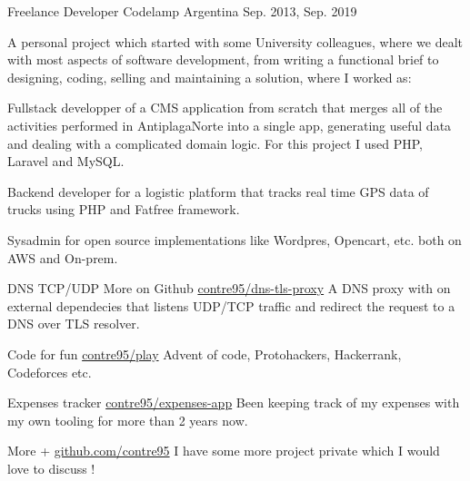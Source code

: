 \hypersetup{colorlinks}
\begin{cventries}

	\cventry
	{Freelance Developer} %
	{Codelamp} %
	{Argentina} %
	{Sep. 2013, Sep. 2019} %
	{
		{A personal project which started with some University colleagues, where we dealt with most aspects of software development, from writing a functional brief to designing, coding, selling and maintaining a solution, where I worked as: }
		\linebreak
		\begin{cvitems}
			\item {Fullstack developper of a CMS application from scratch that merges all of the activities performed in AntiplagaNorte into a single app, generating useful data and dealing with a complicated domain logic. For this project I used PHP, Laravel and MySQL.}
			\item {Backend developer for a logistic platform that tracks real time GPS data of trucks using PHP and Fatfree framework.}
			\item {Sysadmin for open source implementations like Wordpres, Opencart, etc. both on AWS and On-prem.}
		\end{cvitems}
	}


	\cventry
	{DNS TCP/UDP } %
	{More on Github} %
	{} %
    {\href{https://github.com/contre95/dns-tls-proxy}{\url{contre95/dns-tls-proxy}}}
    {A DNS proxy with on external dependecies that listens UDP/TCP traffic and redirect the request to a DNS over TLS resolver.}

	\cventry
	{Code for fun} %
	{} %
	{} %
	{\href{https://github.com/contre95/play}{\url{contre95/play}}} %
    {Advent of code, Protohackers, Hackerrank, Codeforces etc. }

	\cventry
	{Expenses tracker} %
	{} %
	{} %
	{\href{https://github.com/contre95/expenses-app}{\url{contre95/expenses-app}}} %
    {Been keeping track of my expenses with my own tooling for more than 2 years now.}

	\cventry
	{More +} %
	{} %
	{} %
	{\href{http://github.com/contre95}{\url{github.com/contre95}}} %
    {I have some more project private which I would love to discuss !}

\end{cventries}
